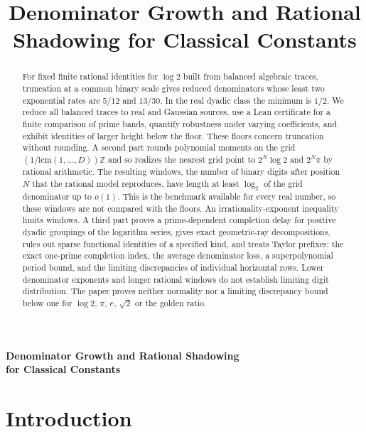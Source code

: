 \documentclass[11pt]{article}
\title{Denominator Growth and Rational Shadowing for Classical Constants}
\begin{document}
\begin{center}
{\LARGE\bfseries Denominator Growth and Rational Shadowing\\
for Classical Constants\par}
\vspace{0.8em}
\end{center}

\begin{abstract}
For fixed finite rational identities for $\log 2$ built from balanced algebraic traces, truncation at a common binary scale gives reduced denominators whose least two exponential rates are $5/12$ and $13/30$. In the real dyadic class the minimum is $1/2$. We reduce all balanced traces to real and Gaussian sources, use a Lean certificate for a finite comparison of prime bands, quantify robustness under varying coefficients, and exhibit identities of larger height below the floor. These floors concern truncation without rounding. A second part rounds polynomial moments on the grid $(1/\mathrm{lcm}(1,\dots,D))\mathbb Z$ and so realizes the nearest grid point to $2^N\log 2$ and $2^N\pi$ by rational arithmetic. The resulting windows, the number of binary digits after position $N$ that the rational model reproduces, have length at least $\log_2$ of the grid denominator up to $o(1)$. This is the benchmark available for every real number, so these windows are not compared with the floors. An irrationality-exponent inequality limits windows. A third part proves a prime-dependent completion delay for positive dyadic groupings of the logarithm series, gives exact geometric-ray decompositions, rules out sparse functional identities of a specified kind, and treats Taylor prefixes: the exact one-prime completion index, the average denominator loss, a superpolynomial period bound, and the limiting discrepancies of individual horizontal rows. Lower denominator exponents and longer rational windows do not establish limiting digit distribution. The paper proves neither normality nor a limiting discrepancy bound below one for $\log 2$, $\pi$, $e$, $\sqrt2$ or the golden ratio.
\end{abstract}

\section{Introduction}
\end{document}
